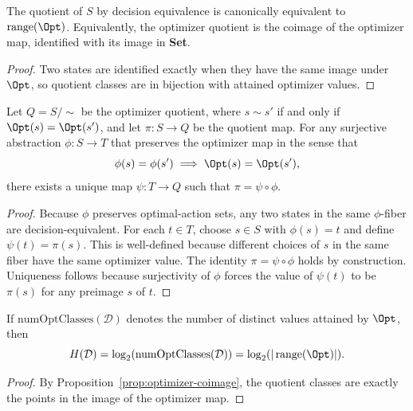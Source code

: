 \begin{proposition}\label{prop:optimizer-coimage}
The quotient of $S$ by decision equivalence is canonically equivalent to $\operatorname{range}(\Opt)$. Equivalently, the optimizer quotient is the coimage of the optimizer map, identified with its image in \textbf{Set}.
\end{proposition}

\begin{proof}
Two states are identified exactly when they have the same image under $\Opt$, so quotient classes are in bijection with attained optimizer values.
\end{proof}

\begin{theorem}\label{thm:quotient-universal}
Let $Q=S/{\sim}$ be the optimizer quotient, where $s \sim s'$ if and only if $\Opt(s)=\Opt(s')$, and let $\pi:S\to Q$ be the quotient map. For any surjective abstraction $\phi:S\to T$ that preserves the optimizer map in the sense that
\[
\phi(s)=\phi(s') \implies \Opt(s)=\Opt(s'),
\]
there exists a unique map $\psi:T\to Q$ such that $\pi=\psi\circ\phi$.
\end{theorem}

\begin{proof}
Because $\phi$ preserves optimal-action sets, any two states in the same $\phi$-fiber are decision-equivalent. For each $t\in T$, choose $s\in S$ with $\phi(s)=t$ and define $\psi(t)=\pi(s)$. This is well-defined because different choices of $s$ in the same fiber have the same optimizer value. The identity $\pi=\psi\circ\phi$ holds by construction. Uniqueness follows because surjectivity of $\phi$ forces the value of $\psi(t)$ to be $\pi(s)$ for any preimage $s$ of $t$.
\end{proof}

\begin{proposition}\label{prop:optimizer-entropy-image}
If $\mathrm{numOptClasses}(\mathcal{D})$ denotes the number of distinct values attained by $\Opt$, then
\[
H(\mathcal{D}) = \log_2(\mathrm{numOptClasses}(\mathcal{D}))
=
\log_2(|\operatorname{range}(\Opt)|).
\]
\end{proposition}

\begin{proof}
By Proposition~\ref{prop:optimizer-coimage}, the quotient classes are exactly the points in the image of the optimizer map.
\end{proof}

